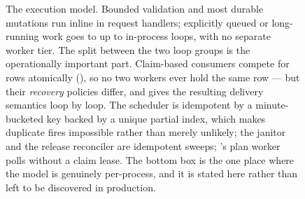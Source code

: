 \begin{figure}[tbp]
\begin{cbscaled}[0.68]
\end{cbscaled}
\caption{The execution model. Bounded validation and most durable mutations run
inline in request handlers; explicitly queued or long-running work goes to up to
\statLoops{} in-process loops, with no separate worker tier. The split between the
two loop groups is the operationally important part. Claim-based consumers compete
for rows atomically (), so no two workers ever hold the same row
--- but their \emph{recovery} policies differ, and  gives the
resulting delivery semantics loop by loop. The scheduler is idempotent by a minute-bucketed key backed by a unique
partial index, which makes duplicate fires impossible rather than merely
unlikely; the janitor and the release reconciler are idempotent sweeps;
\aria's plan worker polls without a claim lease. The bottom box is the one place where the model is genuinely
per-process, and it is stated here rather than left to be discovered in
production.}
\label{fig:execution}
\end{figure}

